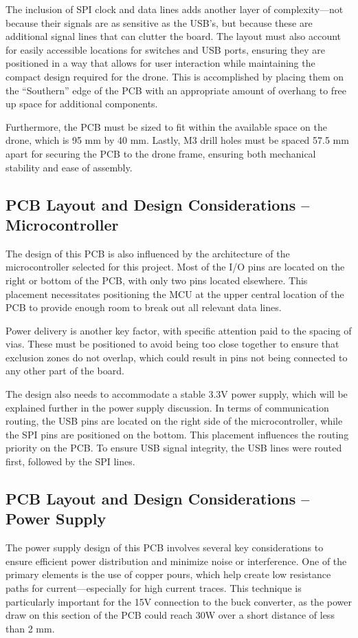 \documentclass[12pt]{article}
\begin{document}
\par The inclusion of SPI clock and data lines adds another layer of complexity—not because their signals are as sensitive as the USB’s, but because these are additional signal lines that can clutter the board. The layout must also account for easily accessible locations for switches and USB ports, ensuring they are positioned in a way that allows for user interaction while maintaining the compact design required for the drone. This is accomplished by placing them on the ``Southern'' edge of the PCB with an appropriate amount of overhang to free up space for additional components.

\par Furthermore, the PCB must be sized to fit within the available space on the drone, which is 95 mm by 40 mm. Lastly, M3 drill holes must be spaced 57.5 mm apart for securing the PCB to the drone frame, ensuring both mechanical stability and ease of assembly.

\subsection{PCB Layout and Design Considerations – Microcontroller}
The design of this PCB is also influenced by the architecture of the microcontroller selected for this project. Most of the I/O pins are located on the right or bottom of the PCB, with only two pins located elsewhere. This placement necessitates positioning the MCU at the upper central location of the PCB to provide enough room to break out all relevant data lines.

\par Power delivery is another key factor, with specific attention paid to the spacing of vias. These must be positioned to avoid being too close together to ensure that exclusion zones do not overlap, which could result in pins not being connected to any other part of the board.

\par The design also needs to accommodate a stable 3.3V power supply, which will be explained further in the power supply discussion. In terms of communication routing, the USB pins are located on the right side of the microcontroller, while the SPI pins are positioned on the bottom. This placement influences the routing priority on the PCB. To ensure USB signal integrity, the USB lines were routed first, followed by the SPI lines.

\subsection{PCB Layout and Design Considerations – Power Supply}
The power supply design of this PCB involves several key considerations to ensure efficient power distribution and minimize noise or interference. One of the primary elements is the use of copper pours, which help create low resistance paths for current—especially for high current traces. This technique is particularly important for the 15V connection to the buck converter, as the power draw on this section of the PCB could reach 30W over a short distance of less than 2 mm.
\end{document}
